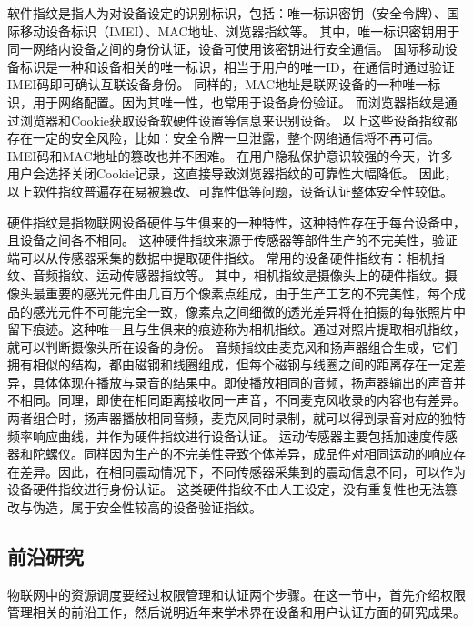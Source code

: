 软件指纹是指人为对设备设定的识别标识，包括：唯一标识密钥（安全令牌）、国际移动设备标识（IMEI）、MAC地址、浏览器指纹等。
其中，唯一标识密钥用于同一网络内设备之间的身份认证，设备可使用该密钥进行安全通信。
国际移动设备标识是一种和设备相关的唯一标识，相当于用户的唯一ID，在通信时通过验证IMEI码即可确认互联设备身份。
同样的，MAC地址是联网设备的一种唯一标识，用于网络配置。因为其唯一性，也常用于设备身份验证。
而浏览器指纹是通过浏览器和Cookie获取设备软硬件设置等信息来识别设备。
以上这些设备指纹都存在一定的安全风险，比如：安全令牌一旦泄露，整个网络通信将不再可信。
IMEI码和MAC地址的篡改也并不困难。
在用户隐私保护意识较强的今天，许多用户会选择关闭Cookie记录，这直接导致浏览器指纹的可靠性大幅降低。
因此，以上软件指纹普遍存在易被篡改、可靠性低等问题，设备认证整体安全性较低。

硬件指纹是指物联网设备硬件与生俱来的一种特性，这种特性存在于每台设备中，且设备之间各不相同。
这种硬件指纹来源于传感器等部件生产的不完美性，验证端可以从传感器采集的数据中提取硬件指纹。
常用的设备硬件指纹有：相机指纹、音频指纹、运动传感器指纹等。
其中，相机指纹是摄像头上的硬件指纹。摄像头最重要的感光元件由几百万个像素点组成，由于生产工艺的不完美性，每个成品的感光元件不可能完全一致，像素点之间细微的透光差异将在拍摄的每张照片中留下痕迹。这种唯一且与生俱来的痕迹称为相机指纹。通过对照片提取相机指纹，就可以判断摄像头所在设备的身份。
音频指纹由麦克风和扬声器组合生成，它们拥有相似的结构，都由磁钢和线圈组成，但每个磁钢与线圈之间的距离存在一定差异，具体体现在播放与录音的结果中。即使播放相同的音频，扬声器输出的声音并不相同。同理，即使在相同距离接收同一声音，不同麦克风收录的内容也有差异。两者组合时，扬声器播放相同音频，麦克风同时录制，就可以得到录音对应的独特频率响应曲线，并作为硬件指纹进行设备认证。
运动传感器主要包括加速度传感器和陀螺仪。同样因为生产的不完美性导致个体差异，成品件对相同运动的响应存在差异。因此，在相同震动情况下，不同传感器采集到的震动信息不同，可以作为设备硬件指纹进行身份认证。
这类硬件指纹不由人工设定，没有重复性也无法篡改与伪造，属于安全性较高的设备验证指纹。
 
 
\subsection{前沿研究}
物联网中的资源调度要经过权限管理和认证两个步骤。在这一节中，首先介绍权限管理相关的前沿工作，然后说明近年来学术界在设备和用户认证方面的研究成果。

